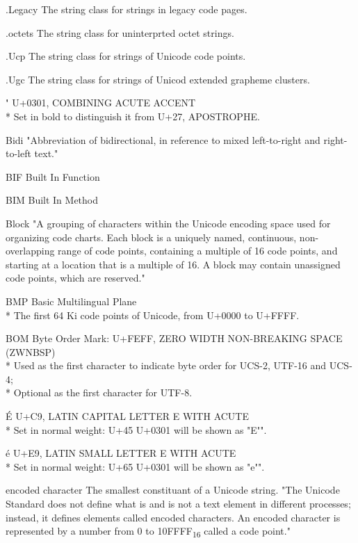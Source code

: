 \documentclass[b4paper]{article}
\begin{document}
\begin{definition}
\item [.Legacy] The string class for strings in legacy code pages.
\item [.octets] The string class for uninterprted octet strings.
\item [.Ucp] The string class for strings of Unicode code points.
\item [.Ugc] The string class for strings of Unicod extended grapheme clusters.
\item [\textbf{\'{ }}] U+0301, COMBINING ACUTE ACCENT
\\*
Set in bold to distinguish it from U+27, APOSTROPHE.
\item [Bidi] "Abbreviation of bidirectional, in reference to mixed left-to-right and right-to-left text."
\item [BIF] Built In Function
\item [BIM] Built In Method
\item [Block] "A grouping of characters within the Unicode encoding
space used for organizing code charts. Each block is a uniquely named,
continuous, non-overlapping range of code points, containing a
multiple of 16 code points, and starting at a location that is a
multiple of 16. A block may contain unassigned code points, which are
reserved."
\item [BMP] Basic Multilingual Plane
\\*
The first 64 Ki code points of Unicode, from U+0000 to U+FFFF.
\item [BOM] Byte Order Mark: U+FEFF, ZERO WIDTH NON-BREAKING SPACE (ZWNBSP)
\\*
Used as the first character to indicate byte order for UCS-2, UTF-16 and UCS-4;
\\*
Optional as the first character for UTF-8.
\item [\'{E}] U+C9, LATIN CAPITAL LETTER E WITH ACUTE
\\*
Set in normal weight: U+45 U+0301 will be shown as "E\textbf{\'{ }}".
\item [\'{e}] U+E9, LATIN SMALL LETTER E WITH ACUTE
\\*
Set in normal weight: U+65 U+0301 will be shown as "e\textbf{\'{ }}".
\item [encoded character] The smallest constituant of a Unicode string.
"The Unicode Standard does not define what is and is not a text
element in different processes; instead, it defines elements called
encoded characters. An encoded character is represented by a number
from 0 to 10FFFF\textsubscript{16} called a code point."

\end{definition}
\end{document}
